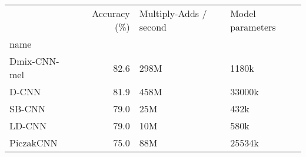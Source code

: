 \begin{tabular}{lrll}
\toprule
{} &  Accuracy (\%) & Multiply-Adds / second & Model parameters \\
name         &               &                        &                  \\
\midrule
Dmix-CNN-mel &          82.6 &                   298M &            1180k \\
D-CNN        &          81.9 &                   458M &           33000k \\
SB-CNN       &          79.0 &                    25M &             432k \\
LD-CNN       &          79.0 &                    10M &             580k \\
PiczakCNN    &          75.0 &                    88M &           25534k \\
\bottomrule
\end{tabular}
